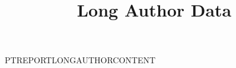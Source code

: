 \documentclass[coreonly,nominted]{pt-report}
\title{Long Author Data}
\date{}
\begin{document}
\maketitle
\noindent PTREPORTLONGAUTHORCONTENT
\end{document}
